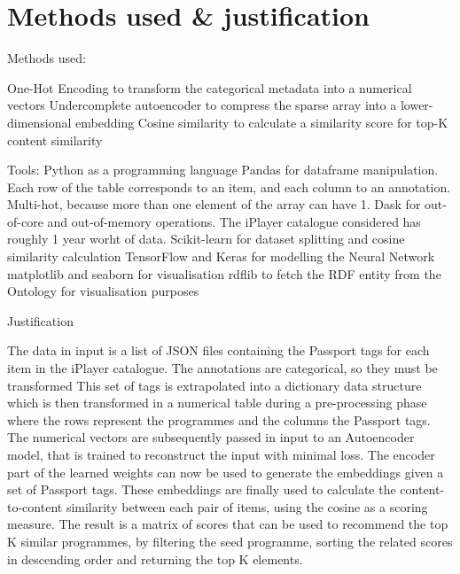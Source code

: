 
\section{Methods used \& justification}

Methods used:

One-Hot Encoding to transform the categorical metadata into a numerical vectors
Undercomplete autoencoder to compress the sparse array into a lower-dimensional embedding
Cosine similarity to calculate a similarity score for top-K content similarity

Tools:
Python as a programming language
Pandas for dataframe manipulation. Each row of the table corresponds to an item, and each column to an annotation. Multi-hot, because more than one element of the array can have 1.
Dask for out-of-core and out-of-memory operations. The iPlayer catalogue considered has roughly 1 year worht of data.
Scikit-learn for dataset splitting and cosine similarity calculation
TensorFlow and Keras for modelling the Neural Network
matplotlib and seaborn for visualisation
rdflib to fetch the RDF entity from the Ontology for visualisation purposes

Justification


The data in input is a list of JSON files containing the Passport tags for each item in the iPlayer catalogue. The annotations
are categorical, so they must be transformed
This set of tags is extrapolated into a dictionary data structure which is then transformed in a numerical table during a pre-processing phase where the rows represent the programmes and the columns the Passport tags. The numerical vectors are subsequently passed in input to an Autoencoder model, that is trained to reconstruct the input with minimal loss. The encoder part of the learned weights can now be used to generate the embeddings given a set of Passport tags. These embeddings are finally used to calculate the content-to-content similarity between each pair of items, using the cosine as a scoring measure. The result is a matrix of scores that can be used to recommend the top K similar programmes, by filtering the seed programme, sorting the related scores in descending order and returning the top K elements.

